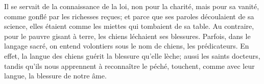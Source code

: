 Il se servait de la connaissance de la loi, non pour la charité,
	mais pour sa vanité, comme gonflé par les richesses reçues;
	et parce que ses paroles découlaient de sa science,
	elles étaient comme les miettes qui tombaient de sa table.
Au contraire, pour le pauvre gisant à terre,
	les chiens léchaient ses blessures.
Parfois, dans le langage sacré,
	on entend volontiers sous le nom de chiens, les prédicateurs.
En effet, la langue des chiens guérit la blessure qu’elle lèche;
	aussi les saints docteurs,
		tandis qu’ils nous apprennent à reconnaître le péché,
	touchent, comme avec leur langue, la blessure de notre âme.
